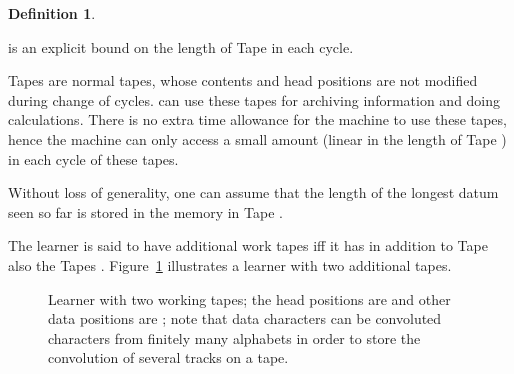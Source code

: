 \documentclass{LMCS}
\theoremstyle{plain}\newtheorem{athm}[thm]{Theorem}
\theoremstyle{plain}\newtheorem{aprop}[thm]{Proposition}
\theoremstyle{plain}\newtheorem{aprob}[thm]{Open Problem}
\theoremstyle{plain}\newtheorem{acor}[thm]{Corollary}
\theoremstyle{plain}\newtheorem{alem}[thm]{Lemma}
\theoremstyle{definition}\newtheorem{adefn}[thm]{Definition}
\theoremstyle{definition}\newtheorem{arem}[thm]{Remark}
\theoremstyle{plain}\newtheorem{aexmp}[thm]{Example}
\theoremstyle{plain}\newtheorem{aclm}[thm]{Claim}
\begin{document}
\begin{adefn}
\begin{iteMize}{}
      is an explicit bound on the length of Tape  in each cycle.
\item Tapes  are normal tapes, whose contents and head positions
      are not modified during change of cycles.  can use these tapes
      for archiving information and doing calculations. There is
      no extra time allowance for the machine to use these tapes, hence
      the machine can only access a small amount (linear in the length
      of Tape ) in each cycle of these tapes.
\item Without loss of generality, one can assume that the length of the
      longest datum seen so far is stored in the memory in Tape .
\end{iteMize}
The learner is said to have  additional work tapes iff
it has in addition to Tape  also the Tapes .
Figure~\ref{figdefnlearner} illustrates a learner with two additional tapes.
\end{adefn}

\begin{figure}[t]
\caption{Learner with two working tapes; the head positions are  and other
   data positions are ; note that data characters can be convoluted
   characters from finitely many alphabets in order to store the convolution
   of several tracks on a tape.} \label{figdefnlearner}
\end{figure}
\end{document}

